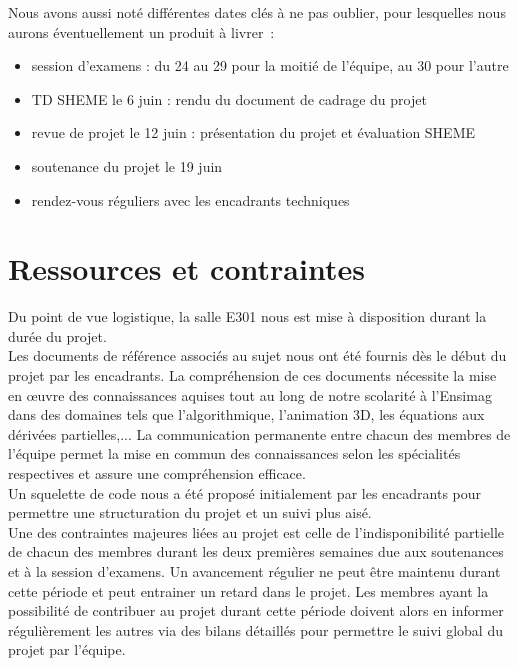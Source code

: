 \documentclass[a4paper,11pt]{article}
\begin{document}
Nous avons aussi noté différentes dates clés à ne pas oublier, pour lesquelles nous aurons éventuellement un produit à livrer~:
\begin{itemize}
\item session d'examens : du 24 au 29 pour la moitié de l'équipe, au 30 pour l'autre
\item TD SHEME le 6 juin : rendu du document de cadrage du projet
\item revue de projet le 12 juin : présentation du projet et évaluation SHEME
\item soutenance du projet le 19 juin
\item rendez-vous réguliers avec les encadrants techniques
\end{itemize}

\section{Ressources et contraintes}

Du point de vue logistique, la salle E301 nous est mise à disposition durant la durée du projet.\\

Les documents de référence associés au sujet nous ont été fournis dès le début du projet par les encadrants. La compréhension de ces documents nécessite la mise en \oe{}uvre des connaissances aquises tout au long de notre scolarité à l'Ensimag dans des domaines tels que l'algorithmique, l'animation 3D, les équations aux dérivées partielles,... La communication permanente entre chacun des membres de l'équipe permet la mise en commun des connaissances selon les spécialités respectives et assure une compréhension efficace.\\

Un squelette de code nous a été proposé initialement par les encadrants pour permettre une structuration du projet et un suivi plus aisé.\\ 

Une des contraintes majeures liées au projet est celle de l'indisponibilité partielle de chacun des membres durant les deux premières semaines due aux soutenances et à la session d'examens. Un avancement régulier ne peut être maintenu durant cette période et peut entrainer un retard dans le projet. Les membres ayant la possibilité de contribuer au projet durant cette période doivent alors en informer régulièrement les autres via des bilans détaillés pour permettre le suivi global du projet par l'équipe.
\end{document}
